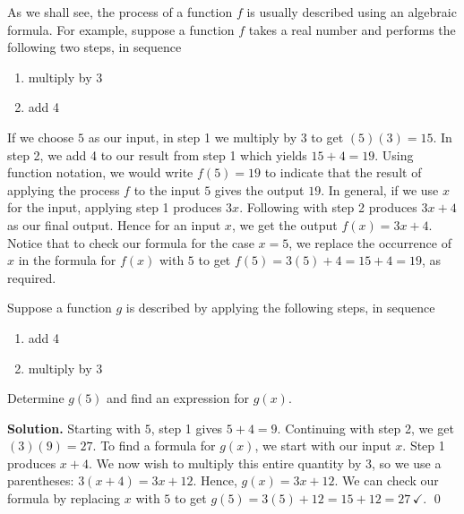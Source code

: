 \medskip

As we shall see, the process of a function $f$ is usually described using an algebraic formula. For example, suppose a function $f$ takes a real number and performs the following two steps, in sequence

\begin{enumerate}

\item  multiply by 3

\item  add 4

\end{enumerate}

If we choose $5$ as our input,  in step 1 we multiply by $3$ to get $(5)(3) = 15$.  In step 2, we add 4 to our result from step 1 which yields $15 + 4 = 19$.  Using function notation, we would write  $f(5) = 19$ to indicate that the result of applying the process $f$ to the input $5$ gives the output $19$.  In general, if we use $x$ for the input, applying step 1 produces $3x$.  Following with step 2 produces $3x+4$ as our final output.  Hence for an input $x$, we get the output $f(x) = 3x + 4$.  Notice that to check our formula for the case $x=5$, we replace the occurrence of $x$ in the formula for $f(x)$ with $5$ to get $f(5) = 3(5) + 4 = 15 + 4 = 19$, as required.

\medskip

\begin{ex}  Suppose a function $g$ is described by applying the following steps, in sequence

\begin{enumerate}

\item  add 4

\item  multiply by 3

\end{enumerate}

Determine $g(5)$ and find an expression for $g(x)$.

\medskip

{\bf Solution.}  Starting with $5$, step 1 gives $5+4 = 9$.  Continuing with step 2, we get $(3)(9) = 27$.  To find a formula for $g(x)$, we start with our input $x$.  Step 1 produces $x+4$.  We now wish to multiply this entire quantity by $3$, so we use a parentheses: $3(x+4) = 3x + 12$.  Hence, $g(x) = 3x + 12$.  We can check our formula by replacing $x$ with $5$ to get $g(5) = 3(5) + 12 = 15 + 12 = 27 \, \checkmark$.  \qed

\end{ex}

